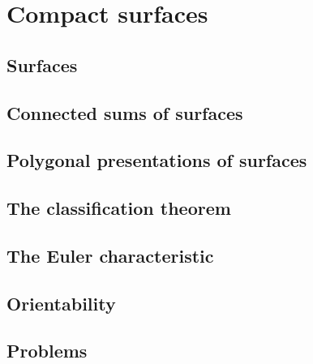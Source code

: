 \chapter{Compact surfaces}
\section{Surfaces}
\section{Connected sums of surfaces}
\section{Polygonal presentations of surfaces}
\section{The classification theorem}
\section{The Euler characteristic}
\section{Orientability}
\section{Problems}

